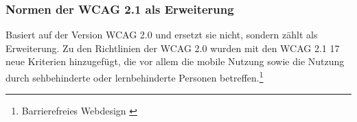 \subsubsection{Normen der \ac{WCAG} 2.1 als Erweiterung}
\label{subsec: Normen der WCAG 2.1}

Basiert auf der Version \ac{WCAG} 2.0 und ersetzt sie nicht, sondern zählt als Erweiterung. Zu den Richtlinien der \ac{WCAG} 2.0 wurden mit den \ac{WCAG} 2.1 17 neue Kriterien hinzugefügt, die vor allem die mobile Nutzung sowie die Nutzung durch sehbehinderte oder lernbehinderte Personen betreffen.\footnote{Barrierefreies Webdesign \cite{BarrierefreiesWebdesign}}

